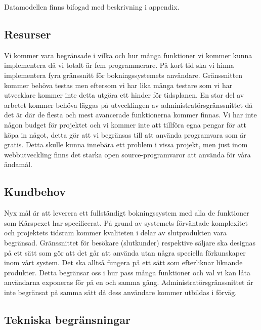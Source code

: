 \documentclass[a4paper, twoside, 11pt, titlepage]{article}
\begin{document}
	Datamodellen finns bifogad med beskrivning i appendix.

	\subsection{Resurser}


	Vi kommer vara begränsade i vilka och hur många funktioner vi kommer kunna implementera då vi totalt är fem programmerare. På kort tid ska vi hinna implementera fyra gränssnitt för bokningssystemets användare. Gränssnitten kommer behöva testas men eftersom vi har lika många testare som vi har utvecklare kommer inte detta utgöra ett hinder för tidsplanen. En stor del av arbetet kommer behöva läggas på utvecklingen av administratörsgränssnittet då det är där de flesta och mest avancerade funktionerna kommer finnas. Vi har inte någon budget för projektet och vi kommer inte att tillföra egna pengar för att köpa in något, detta gör att vi begränsas till att använda programvara som är gratis. Detta skulle kunna innebära ett problem i vissa projekt, men just inom webbutveckling finns det starka open source-programvaror att använda för våra ändamål.

	\subsection{Kundbehov}


	Nyx mål är att leverera ett fullständigt bokningssystem med alla de funktioner som Kårspexet har specificerat. På grund av systemets förväntade komplexitet och projektets tidsram kommer kvaliteten i delar av slutprodukten vara begränsad. Gränssnittet för besökare (slutkunder) respektive säljare ska designas på ett sätt som gör att det går att använda utan några speciella förkunskaper inom vårt system. Det ska alltså fungera på ett sätt som efterliknar liknande produkter. Detta begränsar oss i hur pass många funktioner och val vi kan låta användarna exponeras för på en och samma gång. Administratörsgränssnittet är inte begränsat på samma sätt då dess användare kommer utbildas i förväg.

	\subsection{Tekniska begränsningar}
\end{document}
